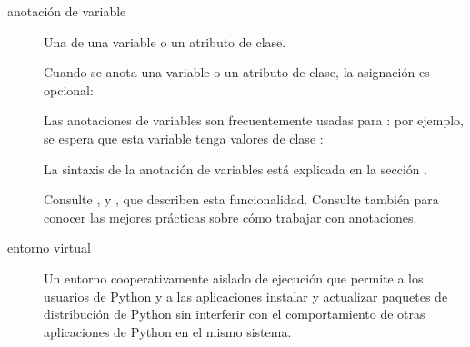 \documentclass[a4,10pt,spanish]{sphinxmanual}
\begin{document}
\begin{description}
\item[{anotación de variable\label{\detokenize{glossary:term-variable-annotation}}}] \leavevmode
\sphinxAtStartPar
Una {\hyperref[\detokenize{glossary:term-annotation}]{}} de una variable o un atributo de clase.

\sphinxAtStartPar
Cuando se anota una variable o un atributo de clase, la asignación es opcional:

\begin{sphinxVerbatim}[commandchars=\\\{\}]
 
     
\end{sphinxVerbatim}

\sphinxAtStartPar
Las anotaciones de variables son frecuentemente usadas para {\hyperref[\detokenize{glossary:term-type-hint}]{}}: por ejemplo, se espera que esta variable tenga valores de clase :

\begin{sphinxVerbatim}[commandchars=\\\{\}]
   
\end{sphinxVerbatim}

\sphinxAtStartPar
La sintaxis de la anotación de variables está explicada en la sección .

\sphinxAtStartPar
Consulte {\hyperref[\detokenize{glossary:term-function-annotation}]{}},  y , que describen esta funcionalidad. Consulte también  para conocer las mejores prácticas sobre cómo trabajar con anotaciones.

\item[{entorno virtual\label{\detokenize{glossary:term-virtual-environment}}}] \leavevmode
\sphinxAtStartPar
Un entorno cooperativamente aislado de ejecución que permite a los usuarios de Python y a las aplicaciones instalar y actualizar paquetes de distribución de Python sin interferir con el comportamiento de otras aplicaciones de Python en el mismo sistema.


\end{description}
\end{document}
